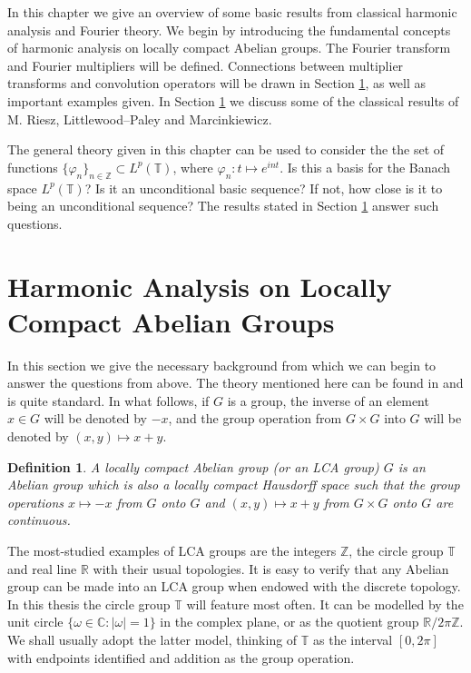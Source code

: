 \documentclass[12pt]{UNSWthesis}
\newcommand{\R}{\mathbb{R}}
\newcommand{\C}{\mathbb{C}}
\newcommand{\T}{\mathbb{T}}
\newcommand{\Z}{\mathbb{Z}}
\newtheorem{definition}[theorem]{Definition}
\numberwithin{equation}{section}
\begin{document}
In this chapter we give an overview of some basic results from classical
harmonic analysis and Fourier theory.
We begin by introducing the fundamental concepts of harmonic analysis on locally
compact Abelian groups. The Fourier transform and Fourier multipliers will be
defined. Connections between multiplier transforms and convolution operators 
will
be drawn in Section \ref{lca}, as well as important examples given. In
Section \ref{lca} we discuss some of the classical results of M. Riesz,
Littlewood--Paley and Marcinkiewicz.

The general theory given in this chapter can be used to consider the
the set of functions $\{\varphi_n\}_{n\in\Z}\subset L^p(\T)$, where
$\varphi_n:t\mapsto e^{int}$. Is this a basis for the Banach space $L^p(\T)$?
Is it an unconditional basic sequence? If not, how close is it
to being an unconditional sequence? The results stated in Section 
\ref{lca}
answer such questions.




\section{Harmonic Analysis on Locally Compact Abelian Groups}\label{lca}


In this section we give the necessary background from which we can begin to
answer
the questions from
above. The theory mentioned here can be found in \cite{Katznelson}
and is quite 
standard. In what follows, if $G$ is a group, the inverse of an
element $x\in G$ will be denoted by $-x$, and the group operation from
$G\times G$ into $G$ will be denoted by $(x,y)\mapsto x+y$. 


\begin{definition} A {\em locally compact Abelian group} (or an LCA group)
$G$ is an Abelian group
which is also a locally compact Hausdorff space such that the group operations
$x\mapsto -x$ from $G$ onto $G$ and $(x,y)\mapsto x+y$ from $G\times G$
onto $G$ are continuous. 
\end{definition}

The most-studied examples of LCA groups are the integers $\Z$, the circle group
$\T$ and real line $\R$ with their usual topologies. 
It is easy to verify that any Abelian group can be made into an LCA group
when endowed with the discrete topology. In this thesis the circle group $\T$
will feature most often. It can be modelled by the unit circle
$\{\omega\in\C:|\omega|=1\}$
in the complex plane, or as the quotient group $\R/2\pi\Z$. We shall usually
adopt the latter model,
thinking of $\T$ as the interval $[0,2\pi]$ with endpoints identified and
addition as the group operation.
\end{document}

